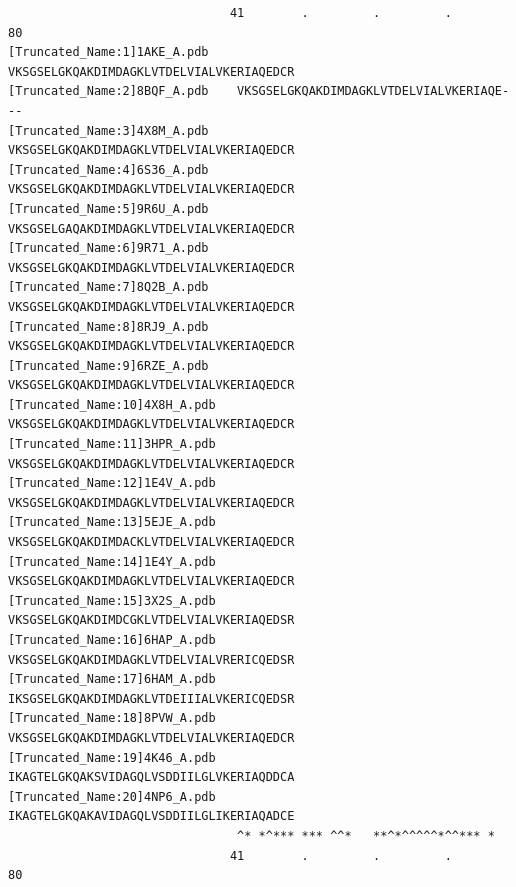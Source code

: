 \documentclass[
  letterpaper,
  DIV=11,
  numbers=noendperiod]{scrartcl}
\begin{document}
\begin{verbatim}
                               41        .         .         .         80 
[Truncated_Name:1]1AKE_A.pdb    VKSGSELGKQAKDIMDAGKLVTDELVIALVKERIAQEDCR
[Truncated_Name:2]8BQF_A.pdb    VKSGSELGKQAKDIMDAGKLVTDELVIALVKERIAQE---
[Truncated_Name:3]4X8M_A.pdb    VKSGSELGKQAKDIMDAGKLVTDELVIALVKERIAQEDCR
[Truncated_Name:4]6S36_A.pdb    VKSGSELGKQAKDIMDAGKLVTDELVIALVKERIAQEDCR
[Truncated_Name:5]9R6U_A.pdb    VKSGSELGAQAKDIMDAGKLVTDELVIALVKERIAQEDCR
[Truncated_Name:6]9R71_A.pdb    VKSGSELGKQAKDIMDAGKLVTDELVIALVKERIAQEDCR
[Truncated_Name:7]8Q2B_A.pdb    VKSGSELGKQAKDIMDAGKLVTDELVIALVKERIAQEDCR
[Truncated_Name:8]8RJ9_A.pdb    VKSGSELGKQAKDIMDAGKLVTDELVIALVKERIAQEDCR
[Truncated_Name:9]6RZE_A.pdb    VKSGSELGKQAKDIMDAGKLVTDELVIALVKERIAQEDCR
[Truncated_Name:10]4X8H_A.pdb   VKSGSELGKQAKDIMDAGKLVTDELVIALVKERIAQEDCR
[Truncated_Name:11]3HPR_A.pdb   VKSGSELGKQAKDIMDAGKLVTDELVIALVKERIAQEDCR
[Truncated_Name:12]1E4V_A.pdb   VKSGSELGKQAKDIMDAGKLVTDELVIALVKERIAQEDCR
[Truncated_Name:13]5EJE_A.pdb   VKSGSELGKQAKDIMDACKLVTDELVIALVKERIAQEDCR
[Truncated_Name:14]1E4Y_A.pdb   VKSGSELGKQAKDIMDAGKLVTDELVIALVKERIAQEDCR
[Truncated_Name:15]3X2S_A.pdb   VKSGSELGKQAKDIMDCGKLVTDELVIALVKERIAQEDSR
[Truncated_Name:16]6HAP_A.pdb   VKSGSELGKQAKDIMDAGKLVTDELVIALVRERICQEDSR
[Truncated_Name:17]6HAM_A.pdb   IKSGSELGKQAKDIMDAGKLVTDEIIIALVKERICQEDSR
[Truncated_Name:18]8PVW_A.pdb   VKSGSELGKQAKDIMDAGKLVTDELVIALVKERIAQEDCR
[Truncated_Name:19]4K46_A.pdb   IKAGTELGKQAKSVIDAGQLVSDDIILGLVKERIAQDDCA
[Truncated_Name:20]4NP6_A.pdb   IKAGTELGKQAKAVIDAGQLVSDDIILGLIKERIAQADCE
                                ^* *^*** *** ^^*   **^*^^^^^*^^*** *     
                               41        .         .         .         80 


\end{verbatim}
\end{document}
